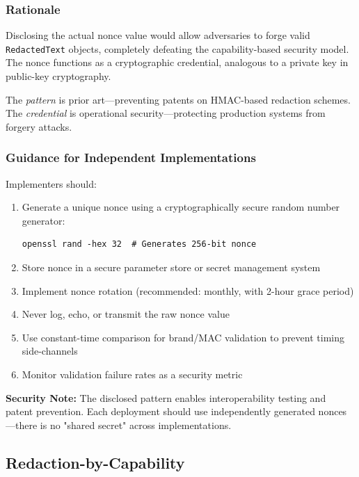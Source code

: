 \documentclass[11pt,a4paper]{article}
\begin{document}
\subsubsection{Rationale}

Disclosing the actual nonce value would allow adversaries to forge valid 
\texttt{RedactedText} objects, completely defeating the capability-based 
security model. The nonce functions as a cryptographic credential, analogous 
to a private key in public-key cryptography.

The \textit{pattern} is prior art—preventing patents on HMAC-based 
redaction schemes. The \textit{credential} is operational security—protecting 
production systems from forgery attacks.

\subsubsection{Guidance for Independent Implementations}

Implementers should:
\begin{enumerate}
\item Generate a unique nonce using a cryptographically secure random 
number generator:
\begin{verbatim}
openssl rand -hex 32  # Generates 256-bit nonce
\end{verbatim}

\item Store nonce in a secure parameter store or secret management system

\item Implement nonce rotation (recommended: monthly, with 2-hour grace period)

\item Never log, echo, or transmit the raw nonce value

\item Use constant-time comparison for brand/MAC validation to prevent 
timing side-channels

\item Monitor validation failure rates as a security metric
\end{enumerate}

\textbf{Security Note:} The disclosed pattern enables interoperability 
testing and patent prevention. Each deployment should use independently 
generated nonces—there is no "shared secret" across implementations.

\subsection{Redaction-by-Capability}
\end{document}
